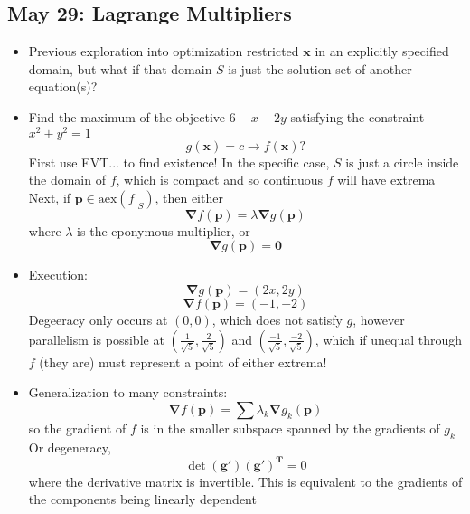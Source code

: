\documentclass[10pt, oneside]{article}
\renewcommand{\vec}[1]{\mathbf{#1}}
\newcommand{\vecf}[1]{\boldsymbol{#1}}
\newcommand{\mat}[1]{\mathbf{#1}}
\begin{document}
\subsection{May 29: Lagrange Multipliers}
\begin{itemize}
    \item Previous exploration into optimization restricted $\vec{x}$ in an explicitly specified domain, but what if that domain $S$ is just the solution set of another equation(s)?
    \item Find the maximum of the objective $6 - x - 2y$ satisfying the constraint $x^2 + y^2 = 1$
            \[g(\vec{x}) = c \rightarrow f(\vec{x})?\]
        First use EVT... to find existence! In the specific case, $S$ is just a circle inside the domain of $f$, which is compact and so continuous $f$ will have extrema\\
        Next, if $\vec{p} \in \text{aex}(f|_S)$, then either
            \[\vec{\nabla} f(\vec{p}) = \lambda \vec{\nabla} g(\vec{p})\]
        where $\lambda$ is the eponymous multiplier, or
            \[\vec{\nabla} g(\vec{p}) = \vec{0}\]
    \item Execution:
            \[\vec{\nabla} g(\vec{p}) = (2x, 2y)\]
            \[\vec{\nabla} f(\vec{p}) = (-1,-2)\]
        Degeeracy only occurs at $(0,0)$, which does not satisfy $g$, however parallelism is possible at $(\frac{1}{\sqrt{5}},\frac{2}{\sqrt{5}})$ and $(\frac{-1}{\sqrt{5}},\frac{-2}{\sqrt{5}})$, which if unequal through $f$ (they are) must represent a point of either extrema!
            
    \item Generalization to many constraints:
                \[\vec{\nabla} f(\vec{p}) = \sum \lambda_k \vec{\nabla} g_k(\vec{p})\]
            so the gradient of $f$ is in the smaller subspace spanned by the gradients of $g_k$\\    
            Or degeneracy,
                \[\det (\vecf{g}')(\vecf{g}')^\mat{T} = 0\]
            where the derivative matrix is invertible. This is equivalent to the gradients of the components being linearly dependent
\end{itemize}
\end{document}
